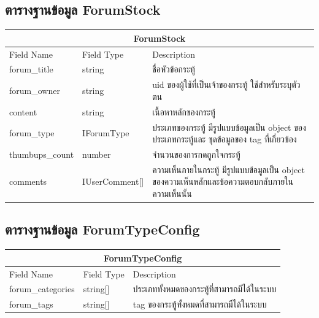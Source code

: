 \subsection{ตารางฐานข้อมูล ForumStock}
\begin{table}[H]
    \begin{tabular*}{\textwidth}{l|l|p{}}
        \hline
        \multicolumn{3}{c}{ForumStock}  \\ \hline
        Field Name      & Field Type         & Description                                                                             \\\hline
        forum\_title    & string             & ชื่อหัวข้อกระทู้                                                                                \\
        forum\_owner    & string             & uid ของผู้ใช้ที่เป็นเจ้าของกระทู้ ใช้สำหรับระบุตัวตน                                            \\
        content         & string             & เนื้อหาหลักของกระทู้                                                                            \\
        forum\_type     & IForumType         & ประเภทของกระทู้ มีรูปแบบข้อมูลเป็น object ของประเภทกระทู้และ ชุดข้อมูลของ tag ที่เกี่ยวข้อง     \\
        thumbups\_count & number             & จำนวนของการกดถูกใจกระทู้                                                                        \\
        comments        & IUserComment{[}{]} & ความเห็นภายในกระทู้ มีรูปแบบข้อมูลเป็น object ของความเห็นหลักและข้อความตอบกลับภายในความเห็นนั้น \\ \hline
    \end{tabular*}
\end{table}

\subsection{ตารางฐานข้อมูล ForumTypeConfig}
\begin{table}[H]
    \begin{tabular*}{\textwidth}{l|l|p{}}
        \hline
        \multicolumn{3}{c}{ForumTypeConfig}                                           \\\hline
        Field Name        & Field Type   & Description                                \\\hline
        forum\_categories & string{[}{]} & ประเภททั้งหมดของกระทู้ที่สามารถมีได้ในระบบ \\
        forum\_tags       & string{[}{]} & tag ของกระทู้ทั้งหมดที่สามารถมีได้ในระบบ \\ \hline
    \end{tabular*}
\end{table}

